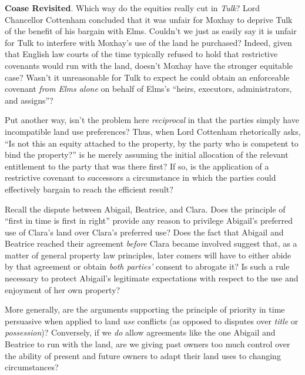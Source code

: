 
\item \textbf{Coase Revisited}. Which way do the equities really cut in
\textit{Tulk}? Lord Chancellor Cottenham concluded that it was unfair for Moxhay
to deprive Tulk of the benefit of his bargain with Elms. Couldn't we just as
easily say it is unfair for Tulk to interfere with Moxhay's use of the land he
purchased? Indeed, given that English law courts of the time typically refused
to hold that restrictive covenants would run with the land, doesn't Moxhay have
the stronger equitable case? Wasn't it unreasonable for Tulk to expect he could
obtain an enforceable covenant \textit{from Elms alone} on behalf of Elms's
``heirs, executors, administrators, and assigns''? 

\item Put another way, isn't the problem here \textit{reciprocal} in that the
parties simply have incompatible land use preferences? Thus, when Lord Cottenham
rhetorically asks, ``Is not this an equity attached to the property, by the
party who is competent to bind the property?'' is he merely assuming the initial
allocation of the relevant entitlement to the party that was there first? If so,
is the application of a restrictive covenant to successors a circumstance in
which the parties could effectively bargain to reach the efficient result?

\item Recall the dispute between Abigail, Beatrice, and Clara. Does the
principle of ``first in time is first in right'' provide any reason to privilege
Abigail's preferred use of Clara's land over Clara's preferred use? Does the
fact that Abigail and Beatrice reached their agreement \textit{before} Clara
became involved suggest that, as a matter of general property law principles,
later comers will have to either abide by that agreement or obtain \textit{both
parties'} consent to abrogate it? Is such a rule necessary to protect Abigail's
legitimate expectations with respect to the use and enjoyment of her own
property? 

\item More generally, are the arguments supporting the principle of priority in
time persuasive when applied to land \textit{use} conflicts (as opposed to
disputes over \textit{title} or \textit{possession})? Conversely, if we
\textit{do} allow agreements like the one Abigail and Beatrice to run with the
land, are we giving past owners too much control over the ability of present and
future owners to adapt their land uses to changing circumstances?

